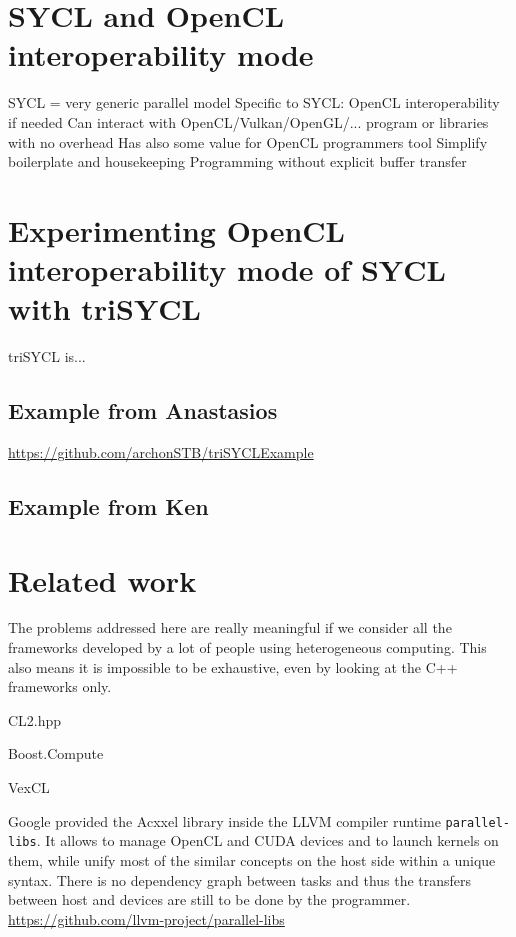\documentclass[sigplan, review]{acmart}
\begin{document}
\section{SYCL and OpenCL interoperability mode}
\label{sec:sycl-opencl-inter}

 SYCL = very generic parallel model
 Specific to SYCL: OpenCL interoperability if needed
 Can interact with OpenCL/Vulkan/OpenGL/... program or libraries with no overhead
 Has also some value for OpenCL programmers tool
 Simplify boilerplate and housekeeping
 Programming without explicit buffer transfer

\section{Experimenting OpenCL interoperability mode of SYCL with triSYCL}
\label{sec:exper-with-opencl}

triSYCL is...

\subsection{Example from Anastasios}
\label{sec:example-from-anast}


\url{https://github.com/archonSTB/triSYCLExample}

\subsection{Example from Ken}
\label{sec:example-from-ken}


\section{Related work}
\label{sec:related-work}

The problems addressed here are really meaningful if we consider all
the frameworks developed by a lot of people using heterogeneous
computing. This also means it is impossible to be exhaustive, even by
looking at the C++ frameworks only.

CL2.hpp

Boost.Compute

VexCL

Google provided the Acxxel library \cite{Acxxel} inside the LLVM
compiler runtime \texttt{parallel-libs}. It allows to manage OpenCL
and CUDA devices and to launch kernels on them, while unify most of
the similar concepts on the host side within a unique syntax. There is
no dependency graph between tasks and thus the transfers between host
and devices are still to be done by the programmer.
\url{https://github.com/llvm-project/parallel-libs}
\end{document}
